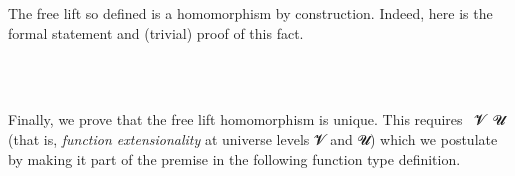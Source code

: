 The free lift so defined is a homomorphism by construction. Indeed, here is the formal
statement and (trivial) proof of this fact.
\ccpad
\begin{code}%
\>[1]\AgdaSpace{}%
\AgdaSymbol{:}\AgdaSpace{}%
\AgdaSymbol{(}\AgdaSpace{}%
\AgdaSymbol{:}\AgdaSpace{}%
\AgdaSpace{}%
\AgdaSpace{}%
\AgdaSymbol{)}\AgdaSpace{}%
\AgdaSpace{}%
\AgdaSymbol{(}\AgdaSpace{}%
\AgdaSpace{}%
\AgdaSpace{}%
\AgdaSpace{}%
\AgdaSymbol{)}\AgdaSpace{}%
\AgdaSpace{}%
\AgdaSpace{}%
\AgdaSymbol{(}\AgdaSpace{}%
\AgdaSymbol{)}\AgdaSpace{}%
\<%
\\
%
\\[\AgdaEmptyExtraSkip]%
%
\>[1]\AgdaSpace{}%
\AgdaSpace{}%
\AgdaSpace{}%
\AgdaSymbol{=}\AgdaSpace{}%
\AgdaSpace{}%
\AgdaSpace{}%
\AgdaSpace{}%
\AgdaOperator{\AgdaInductiveConstructor{,}}\AgdaSpace{}%
\AgdaSpace{}%
\AgdaSpace{}%
\AgdaSpace{}%
\AgdaSpace{}%
\AgdaSpace{}%
\AgdaSymbol{(}\AgdaSpace{}%
\AgdaSpace{}%
\AgdaSymbol{)}\AgdaSpace{}%
\<%
\end{code}
\ccpad
Finally, we prove that the free lift homomorphism is unique.  This requires
~\ab 𝓥~\ab 𝓤 (that is, \emph{function extensionality} at universe levels
\ab 𝓥 and \ab 𝓤) which we postulate by making it part of the premise in the
following function type definition.
\ccpad
